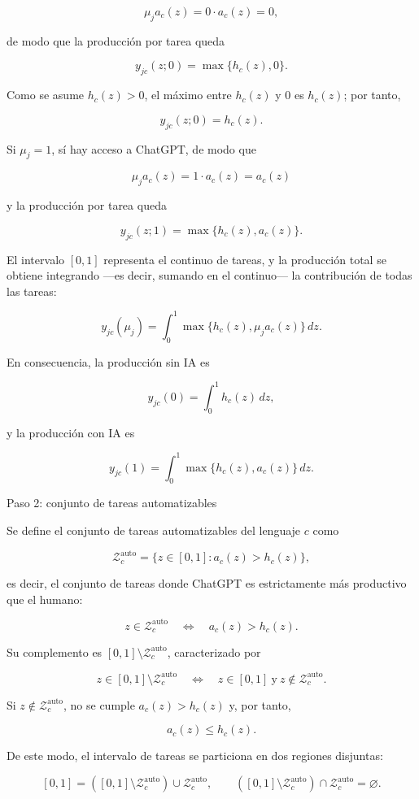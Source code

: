 \documentclass[12pt,a4paper]{article}
\let\textbf\textmd
\newcommand{\Zauto}{\mathcal{Z}^{\mathrm{auto}}_c}
\newcommand{\dd}{\,dz}
\begin{document}
\[
\mu_j a_c(z)=0\cdot a_c(z)=0,
\]

de modo que la producción por tarea queda

\[
y_{jc}(z;0)=\max\{h_c(z),0\}.
\]

Como se asume $h_c(z)>0$, el máximo entre $h_c(z)$ y $0$ es $h_c(z)$; por tanto,

\[
y_{jc}(z;0)=h_c(z).
\]

Si $\mu_j=1$, sí hay acceso a ChatGPT, de modo que

\[
\mu_j a_c(z)=1\cdot a_c(z)=a_c(z)
\]

y la producción por tarea queda

\[
y_{jc}(z;1)=\max\{h_c(z),a_c(z)\}.
\]

El intervalo $[0,1]$ representa el continuo de tareas, y la producción total se obtiene integrando —es decir, sumando en el continuo— la contribución de todas las tareas:

\[
y_{jc}(\mu_j)=\int_0^1 \max\{h_c(z),\mu_j a_c(z)\}\dd.
\]

En consecuencia, la producción sin IA es

\[
y_{jc}(0)=\int_0^1 h_c(z)\dd,
\]

y la producción con IA es

\[
y_{jc}(1)=\int_0^1 \max\{h_c(z),a_c(z)\}\dd.
\]

\bigskip
\noindent\textbf{Paso 2: conjunto de tareas automatizables}

\medskip
\noindent Se define el conjunto de tareas automatizables del lenguaje $c$ como

\[
\Zauto=\{z\in[0,1]:a_c(z)>h_c(z)\},
\]

es decir, el conjunto de tareas donde ChatGPT es estrictamente más productivo que el humano:

\[
z\in\Zauto
\quad \Longleftrightarrow \quad
a_c(z)>h_c(z).
\]

Su complemento es $[0,1]\setminus \Zauto$, caracterizado por

\[
z\in[0,1]\setminus \Zauto
\quad \Longleftrightarrow \quad
z\in[0,1]\ \text{y}\ z\notin\Zauto.
\]

Si $z\notin\Zauto$, no se cumple $a_c(z)>h_c(z)$ y, por tanto,

\[
a_c(z)\leq h_c(z).
\]

De este modo, el intervalo de tareas se particiona en dos regiones disjuntas:

\[
[0,1]=([0,1]\setminus\Zauto)\cup \Zauto,
\qquad
([0,1]\setminus\Zauto)\cap\Zauto=\varnothing.
\]
\end{document}
